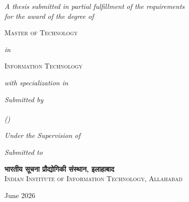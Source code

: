 \frontmatter
\pagestyle{plain}


\begin{titlepage}
\begin{singlespacing}
\begin{center}

\vspace*{3mm}
{\LARGE\bfseries \ttitle\par}

\vspace{5mm}
\textit{A thesis submitted in partial fulfillment of the requirements\\for the award of the degree of}

\vspace{4mm}
{\huge\textsc{Master of Technology}}

\vspace{2mm}
\textit{in}

\vspace{2mm}
{\Large\textsc{Information Technology}}

\vspace{3mm}
\textit{with specialization in}

\vspace{2mm}
{\Large\textsc{\specializationname}}

\vspace{5mm}
\vspace{5mm}

\textit{Submitted by}\\[2mm]
{\Large\textsc{\studentonename}}\\[1.5mm]
\textit{(\studentoneroll)}

\vspace{4mm}
\textit{Under the Supervision of}\\[2mm]
{\Large\textsc{\supname}}

\vspace{4mm}
\textit{Submitted to}\\[2mm]
{\Large\textsc{\deptname}}

\vspace{6mm}
{\large\textbf{\texthindi{भारतीय सूचना प्रौद्योगिकी संस्थान, इलाहाबाद}}}\\[2mm]
{\large\textsc{Indian Institute of Information Technology, Allahabad}}

\vspace{3mm}
June 2026

\end{center}
\end{singlespacing}
\end{titlepage}

